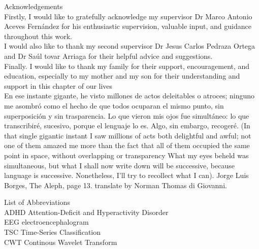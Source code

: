 \documentclass[letterpaper,12pt,openright,oneside]{article}
\begin{document}
\pagebreak




Acknowledgements\\

Firstly, I would like to gratefully acknowledge my supervisor Dr Marco Antonio Aceves Fernández for his enthusiastic supervision, valuable input, and guidance throughout this work.\\

I would also like to thank my second supervisor Dr Jesus Carlos Pedraza Ortega and Dr Saúl tovar Arriaga for their helpful advice and suggestions.\\

Finally. I would like to thank my family for their support, encouragement, and education, especially to my mother and my son for their understanding and support in this chapter of our lives\\

En ese instante gigante, he visto millones de actos deleitables o atroces; ninguno me asombró como el hecho de que todos ocuparan el mismo punto, sin superposición y sin trasparencia. Lo que vieron mis ojos fue simultáneo: lo que transcribiré, sucesivo, porque el lenguaje lo es. Algo, sin embargo, recogeré.     
(In that single gigantic instant I saw millions of acts both delightful and awful; not one of them amazed me more than the fact that all of them occupied the same point in space, without overlapping or transparency What my eyes beheld was simultaneous, but what I shall now write down will be successive, because language is successive. Nonetheless, I’ll try to recollect what I can).
Jorge Luis Borges, The Aleph, page 13. translate by Norman Thomas di Giovanni.\\

\pagebreak









List of Abbreviations\\

ADHD   Attention-Deficit and Hyperactivity Disorder\\

EEG    electroencephalogram\\

TSC    Time-Series Classification \\

CWT    Continous Wavelet Transform \\
\end{document}
